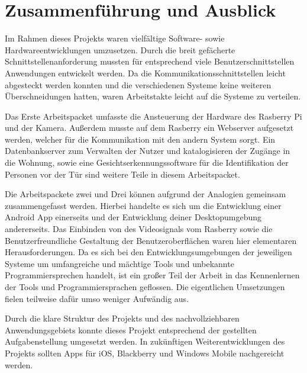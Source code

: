 
\chapter{Zusammenführung und Ausblick}
Im Rahmen dieses Projekts waren vielfältige Software- sowie Hardwareentwicklungen umzusetzen. Durch die breit gefächerte Schnittstellenanforderung mussten für entsprechend viele Benutzerschnittstellen Anwendungen entwickelt werden. Da die Kommunikationsschnittstellen leicht abgesteckt werden konnten und die verschiedenen Systeme keine weiteren Überschneidungen hatten, waren Arbeitstakte leicht auf die Systeme zu verteilen. 
\par
Das Erste Arbeitspacket umfasste die Ansteuerung der Hardware des Rasberry Pi und der Kamera. Außerdem musste auf dem Rasberry ein Webserver aufgesetzt werden, welcher für die Kommunikation mit den andern System sorgt. Ein Datenbankserver zum Verwalten der Nutzer und katalogisieren der Zugänge in die Wohnung, sowie eine Gesichtserkennungssoftware für die Identifikation der Personen vor der Tür sind weitere Teile in diesem Arbeitspacket.
\par
Die Arbeitspackete zwei und Drei können aufgrund der Analogien gemeinsam zusammengefasst werden. Hierbei handelte es sich um die Entwicklung einer Android App einerseits und der Entwicklung deiner Desktopumgebung andererseits. Das Einbinden von des Videosignals vom Rasberry sowie die Benutzerfreundliche Gestaltung der Benutzeroberflächen waren hier elementaren Herausforderungen. Da es sich bei den Entwicklungsumgebungen der jeweiligen Systeme um umfangreiche und mächtige Tools und unbekannte Programmiersprechen handelt, ist ein großer Teil der Arbeit in das Kennenlernen der Tools und Programmiersprachen geflossen. Die eigentlichen Umsetzungen fielen teilweise dafür umso weniger Aufwändig aus. 
\par
Durch die klare Struktur des Projekts und des nachvollziehbaren Anwendungsgebiets konnte dieses Projekt entsprechend der gestellten Aufgabenstellung umgesetzt werden. In zukünftigen Weiterentwicklungen des Projekts sollten Apps für iOS, Blackberry und Windows Mobile nachgereicht werden. 
